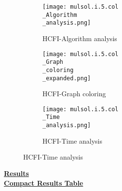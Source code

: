 \documentclass[10pt]{article}
\begin{document}
\graphicspath{{./Core1/Solutions/HCFI/mulsol.i.5.col}}
\begin{figure}[H]
\begin{subfigure}{.33\textwidth}
  \centering
  \texttt{[image: mulsol.i.5.col\\\_Algorithm\\\_analysis.png]}
  \caption{HCFI-Algorithm analysis}
   \label{fig:subfig1}
\end{subfigure}%
\begin{subfigure}{.33\textwidth}
  \centering
  \texttt{[image: mulsol.i.5.col\\\_Graph\\\_coloring\\\_expanded.png]}
  \caption{HCFI-Graph coloring}
  \label{fig:subfig2}
\end{subfigure}
\begin{subfigure}{.33\textwidth}
  \centering
  \texttt{[image: mulsol.i.5.col\\\_Time\\\_analysis.png]}
  \caption{HCFI-Time analysis}
  \end{subfigure}
\end{figure}
\vspace{2cm}
\begin{center}
\hyperlink{page.8}{\textbf{Results}}\\
\vspace{0.5cm}
\hyperlink{page.71}{\textbf{Compact Results Table}}
\end{center}
\pagebreak
\end{document}
